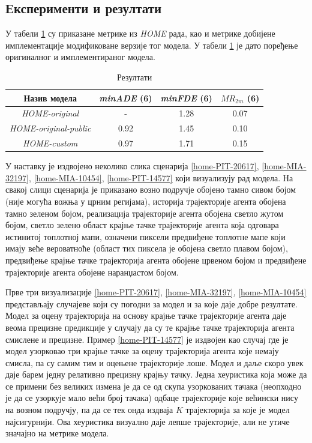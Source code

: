 \documentclass[11pt,oneside]{memoir}
\begin{document}
\subsection{Експерименти и резултати}

У табели \ref{heatmap-results} су приказане метрике из \textit{HOME} \cite{home} рада, као и метрике добијене
имплементације модификоване верзије тог модела. У табели
\ref{heatmap-results} је дато поређење оригиналног и имплементираног модела.

\begin{table}[H]
  \centering
  \begin{tabular}{c|c|c|c}
    Назив модела & \textit{minADE} (6) & \textit{minFDE} (6) & $MR_{2m}$ (6) \\
    \hline
    \textit{HOME-original} & - & 1.28 & 0.07 \\
    \textit{HOME-original-public} & 0.92 & 1.45 & 0.10 \\ 
    \textit{HOME-custom} & 0.97 & 1.71 & 0.15
  \end{tabular}
  \caption{Резултати}
  \label{heatmap-results}
\end{table}

У наставку је издвојено неколико слика сценарија \ref{home-PIT-20617}, \ref{home-MIA-32197}, \ref{home-MIA-10454}, \ref{home-PIT-14577} 
који визуализују рад модела. На свакој слици сценарија је приказано возно подручје обојено тамно сивом бојом (није могућа вожња
у црним регијама), историја трајекторије агента обојена тамно зеленом бојом, реализација трајекторије агента обојена светло жутом бојом,
светло зелено област крајње тачке трајекторије агента која одговара истинитој топлотној мапи, означени пиксели предвиђене топлотне мапе
који имају веће вероватноће (област тих пиксела је обојена светло плавом бојом), предвиђење крајње тачке трајекторија агента
обојене црвеном бојом и предвиђене трајекторије агента обојене наранџастом бојом.

Прве три визуализације \ref{home-PIT-20617}, \ref{home-MIA-32197}, \ref{home-MIA-10454} представљају случајеве који су погодни за модел
и за које даје добре резултате. Модел за оцену трајекторија на основу крајње тачке трајекторије агента даје веома прецизне
предикције у случају да су те крајње тачке трајекторија агента смислене и прецизне. Пример \ref{home-PIT-14577} је издвојен као случај
где је модел узорковао три крајње тачке за оцену трајекторија агента које немају смисла, па су самим тим и оцењене трајекторије лоше.
Модел и даље скоро увек даје барем једну релативно прецизну крајњу тачку. Једна хеуристика која може да се примени без великих измена је да
се од скупа узоркованих тачака (неопходно је да се узоркује мало већи број тачака) одбаце трајекторије које већински нису на возном
подручју, па да се тек онда издваја $K$ трајекторија за које је модел најсигурнији. Ова хеуристика визуално даје
лепше трајекторије, али не утиче значајно на метрике модела.
\end{document}
